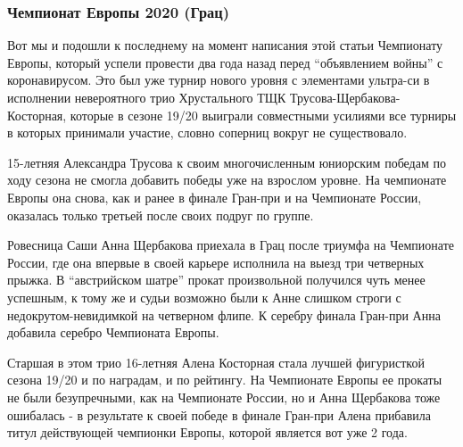  
 
 
 
 
\subsubsection{Чемпионат Европы 2020 (Грац)}

Вот мы и подошли к последнему на момент написания этой статьи Чемпионату
Европы, который успели провести два года назад перед \enquote{объявлением войны} с
коронавирусом. Это был уже турнир нового уровня с элементами ультра-си в
исполнении невероятного трио Хрустального ТЩК Трусова-Щербакова-Косторная,
которые в сезоне 19/20 выиграли совместными усилиями все турниры в которых
принимали участие, словно соперниц вокруг не существовало. 


15-летняя Александра Трусова к своим многочисленным юниорским победам по ходу
сезона не смогла добавить победы уже на взрослом уровне. На чемпионате Европы
она снова, как и ранее в финале Гран-при и на Чемпионате России, оказалась
только третьей после своих подруг по группе.


Ровесница Саши Анна Щербакова приехала в Грац после триумфа на Чемпионате
России, где она впервые в своей карьере исполнила на выезд три четверных
прыжка. В \enquote{австрийском шатре} прокат произвольной получился чуть менее
успешным, к тому же и судьи возможно были к Анне слишком строги с
недокрутом-невидимкой на четверном флипе. К серебру финала Гран-при Анна
добавила серебро Чемпионата Европы.

Старшая в этом трио 16-летняя Алена Косторная стала лучшей фигуристкой сезона
19/20 и по наградам, и по рейтингу. На Чемпионате Европы ее прокаты не были
безупречными, как на Чемпионате России, но и Анна Щербакова тоже ошибалась - в
результате к своей победе в финале Гран-при Алена прибавила титул действующей
чемпионки Европы, которой является вот уже 2 года.

